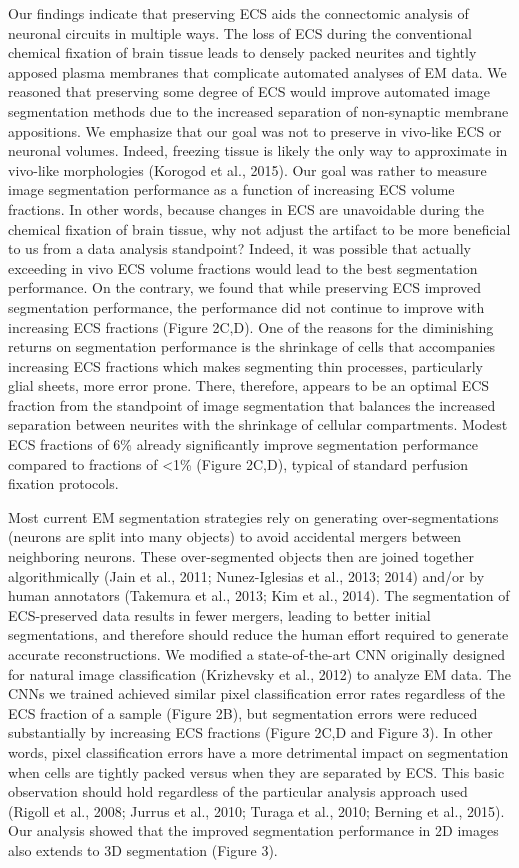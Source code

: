 \documentclass{article}
\begin{document}
Our findings indicate that preserving ECS aids the connectomic analysis of neuronal circuits in multiple ways. The loss of ECS during the conventional chemical fixation of brain tissue leads to densely packed neurites and tightly apposed plasma membranes that complicate automated analyses of EM data. We reasoned that preserving some degree of ECS would improve automated image segmentation methods due to the increased separation of non-synaptic membrane appositions. We emphasize that our goal was not to preserve in vivo-like ECS or neuronal volumes. Indeed, freezing tissue is likely the only way to approximate in vivo-like morphologies (Korogod et al., 2015). Our goal was rather to measure image segmentation performance as a function of increasing ECS volume fractions. In other words, because changes in ECS are unavoidable during the chemical fixation of brain tissue, why not adjust the artifact to be more beneficial to us from a data analysis standpoint? Indeed, it was possible that actually exceeding in vivo ECS volume fractions would lead to the best segmentation performance. On the contrary, we found that while preserving ECS improved segmentation performance, the performance did not continue to improve with increasing ECS fractions (Figure 2C,D). One of the reasons for the diminishing returns on segmentation performance is the shrinkage of cells that accompanies increasing ECS fractions which makes segmenting thin processes, particularly glial sheets, more error prone. There, therefore, appears to be an optimal ECS fraction from the standpoint of image segmentation that balances the increased separation between neurites with the shrinkage of cellular compartments. Modest ECS fractions of 6\% already significantly improve segmentation performance compared to fractions of <1\% (Figure 2C,D), typical of standard perfusion fixation protocols.

Most current EM segmentation strategies rely on generating over-segmentations (neurons are split into many objects) to avoid accidental mergers between neighboring neurons. These over-segmented objects then are joined together algorithmically (Jain et al., 2011; Nunez-Iglesias et al., 2013; 2014) and/or by human annotators (Takemura et al., 2013; Kim et al., 2014). The segmentation of ECS-preserved data results in fewer mergers, leading to better initial segmentations, and therefore should reduce the human effort required to generate accurate reconstructions. We modified a state-of-the-art CNN originally designed for natural image classification (Krizhevsky et al., 2012) to analyze EM data. The CNNs we trained achieved similar pixel classification error rates regardless of the ECS fraction of a sample (Figure 2B), but segmentation errors were reduced substantially by increasing ECS fractions (Figure 2C,D and Figure 3). In other words, pixel classification errors have a more detrimental impact on segmentation when cells are tightly packed versus when they are separated by ECS. This basic observation should hold regardless of the particular analysis approach used (Rigoll et al., 2008; Jurrus et al., 2010; Turaga et al., 2010; Berning et al., 2015). Our analysis showed that the improved segmentation performance in 2D images also extends to 3D segmentation (Figure 3).
\end{document}
